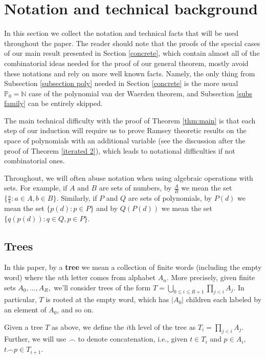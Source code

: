 \documentclass[10pt,a4paper]{article}
\theoremstyle{definition}
\begin{document}
\section{Notation and technical background}

In this section we collect the notation and technical facts that will be used throughout the paper.  The reader should note that the proofs of the special cases of our main result presented in Section \ref{concrete}, which contain almost all of the combinatorial ideas needed for the proof of our general theorem, mostly avoid these notations and rely on more well known facts.  Namely, the only thing from Subsection \ref{subsection poly} needed in Section \ref{concrete} is the more usual $\mathbb{P}_0=\mathbb{N}$ case of the polynomial van der Waerden theorem, and Subsection \ref{subs family} can be entirely skipped.

The main technical difficulty with the proof of Theorem \ref{thm:main} is that each step of our induction will require us to prove Ramsey theoretic results on the space of polynomials with an additional variable (see the discussion after the proof of Theorem \ref{iterated 2}), which leads to notational difficulties if not combinatorial ones.  

Throughout, we will often abuse notation when using algebraic operations with sets.  For example, if $A$ and $B$ are sets of numbers, by $\frac{A}{B}$ we mean the set $\{\frac{a}{b}:a\in A, b\in B\}.$  Similarly, if $P$ and $Q$ are sets of polynomials, by $P(d)$ we mean the set $\{p(d):p\in P\}$ and by $Q(P(d))$ we mean the set $\{q(p(d)): q\in Q,p\in P\}.$

\subsection{Trees}

In this paper, by a \textbf{tree} we mean a collection of finite words (including the empty word) where the $n$th letter comes from alphabet $A_n.$  More precisely, given finite sets $A_0,...,A_R,$ we'll consider trees of the form $T=\bigcup_{0\leq i\leq R+1}\prod_{j<i} A_j. $  In particular, $T$ is rooted at the empty word, which has $|A_0|$ children each labeled by an element of $A_0$, and so on.

Given a tree $T$ as above, we define the $i$th level of the tree as $T_i=\prod_{j<i} A_j.$  Further, we will use $\smallfrown$ to denote concatenation, i.e., given $t\in T_i$ and $p\in A_i,$ $t\smallfrown p\in T_{i+1}.$
\end{document}
